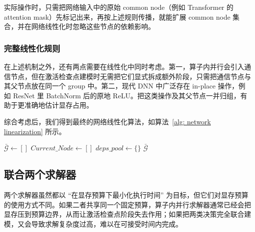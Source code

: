 \documentclass[10pt,letterpaper,twocolumn]{article}
\begin{document}
实际操作时，只需把网络输入中的原始 common node（例如 Transformer 的 attention mask）先标记出来，再按上述规则传播，就能扩展 common node 集合，并在网络线性化时忽略这些节点的依赖影响。

\subsubsection{完整线性化规则}

在上述机制之外，还有两点需要在线性化中同时考虑。第一，算子内并行会引入通信节点，但在激活检查点建模时无需把它们显式拆成额外阶段，只需把通信节点与其父节点放在同一个 group 中。第二，现代 DNN 中广泛存在 in-place 操作，例如 ResNet 里 BatchNorm 后的原地 ReLU。把这类操作及其父节点一并归组，有助于更准确地估计显存占用。

综合考虑后，我们得到最终的网络线性化算法，如算法~\ref{alg: network linearization} 所示。

\begin{algorithm}
\caption{网络线性化算法}
\label{alg: network linearization}
$\bar{\mathcal{G}} \gets []$\;
$Current\_Node \gets []$\;
$deps\_pool \gets \{\}$\;
\Return $\bar{\mathcal{G}}$\;
\end{algorithm}

\subsection{联合两个求解器}

两个求解器虽然都以 ``在显存预算下最小化执行时间'' 为目标，但它们对显存预算的使用方式不同。如果二者共享同一个固定预算，算子内并行求解器通常已经会把显存压到预算边界，从而让激活检查点阶段失去作用；如果把两类决策完全联合建模，又会导致求解复杂度过高，难以在可接受时间内完成。
\end{document}
